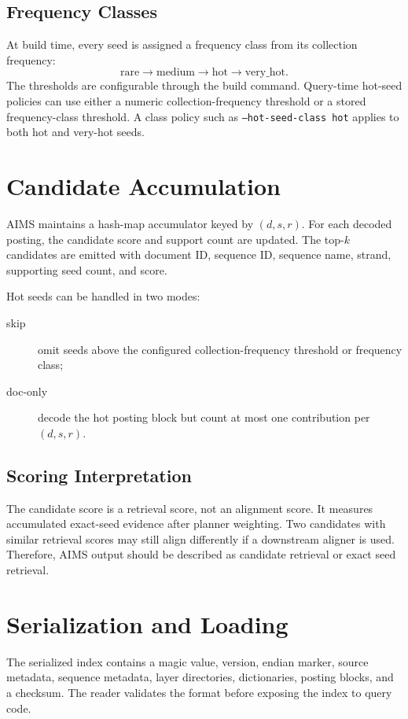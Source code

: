 \documentclass[11pt]{article}
\begin{document}
\subsection{Frequency Classes}

At build time, every seed is assigned a frequency class from its collection frequency:
\[
  \text{rare} \rightarrow \text{medium} \rightarrow \text{hot} \rightarrow \text{very\_hot}.
\]
The thresholds are configurable through the build command. Query-time hot-seed policies can use either a numeric collection-frequency threshold or a stored frequency-class threshold. A class policy such as \texttt{--hot-seed-class hot} applies to both hot and very-hot seeds.

\section{Candidate Accumulation}

AIMS maintains a hash-map accumulator keyed by \((d, s, r)\). For each decoded posting, the candidate score and support count are updated. The top-\(k\) candidates are emitted with document ID, sequence ID, sequence name, strand, supporting seed count, and score.

Hot seeds can be handled in two modes:
\begin{description}
  \item[skip] omit seeds above the configured collection-frequency threshold or frequency class;
  \item[doc-only] decode the hot posting block but count at most one contribution per \((d,s,r)\).
\end{description}

\subsection{Scoring Interpretation}

The candidate score is a retrieval score, not an alignment score. It measures accumulated exact-seed evidence after planner weighting. Two candidates with similar retrieval scores may still align differently if a downstream aligner is used. Therefore, AIMS output should be described as candidate retrieval or exact seed retrieval.

\section{Serialization and Loading}

The serialized index contains a magic value, version, endian marker, source metadata, sequence metadata, layer directories, dictionaries, posting blocks, and a checksum. The reader validates the format before exposing the index to query code.
\end{document}
